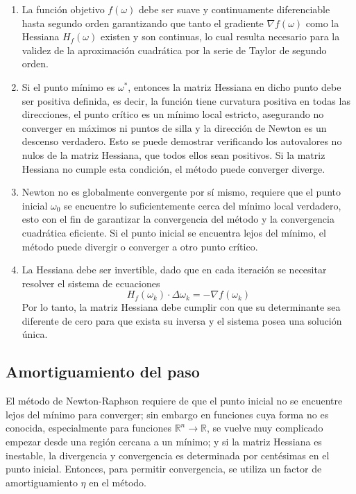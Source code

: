 \documentclass[conference]{IEEEtran}
\begin{document}
\begin{enumerate}
    \item La función objetivo $f(\omega)$ debe ser suave y continuamente diferenciable hasta segundo orden garantizando que tanto el gradiente $\nabla f(\omega)$ como la Hessiana $H_f(\omega)$ existen y son continuas, lo cual resulta necesario para la validez de la aproximación cuadrática por la serie de Taylor de segundo orden.

    \item Si el punto mínimo es $\omega^*$, entonces la matriz Hessiana en dicho punto debe ser positiva definida, es decir, la función tiene curvatura positiva en todas las direcciones, el punto crítico es un mínimo local estricto, asegurando no converger en máximos ni puntos de silla y la dirección de Newton es un descenso verdadero. 
    Esto se puede demostrar verificando los autovalores no nulos de la matriz Hessiana, que todos ellos sean positivos. Si la matriz Hessiana no cumple esta condición, el método puede converger diverge.

    \item Newton no es globalmente convergente por sí mismo, requiere que el punto inicial $\omega_0$ se encuentre lo suficientemente cerca del mínimo local verdadero, esto con el fin de garantizar la convergencia del método y la convergencia cuadrática eficiente.
    Si el punto inicial se encuentra lejos del mínimo, el método puede divergir o converger a otro punto crítico.

    \item La Hessiana debe ser invertible, dado que en cada iteración se necesitar resolver el sistema de ecuaciones
    $$H_{f}(\omega_{k})\cdot\Delta\omega_{k}=-\nabla f(\omega_{k})$$
    Por lo tanto, la matriz Hessiana debe cumplir con que su determinante sea diferente de cero para que exista su inversa y el sistema posea una solución única.
\end{enumerate}

\subsection{Amortiguamiento del paso}\label{sec:damped-method}
El método de Newton-Raphson requiere de que el punto inicial no se encuentre lejos del mínimo para converger; sin embargo en funciones cuya forma no es conocida, especialmente para funciones $\mathbb{R}^{n}\to\mathbb{R}$, se vuelve muy complicado empezar desde una región cercana a un mínimo; y si la matriz Hessiana es inestable, la divergencia y convergencia es determinada por centésimas en el punto inicial. Entonces, para permitir convergencia, se utiliza un factor de amortiguamiento $\eta$ en el método.
\end{document}
